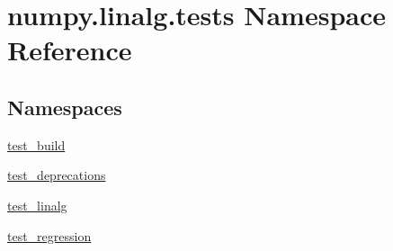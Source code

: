 \hypertarget{namespacenumpy_1_1linalg_1_1tests}{}\section{numpy.\+linalg.\+tests Namespace Reference}
\label{namespacenumpy_1_1linalg_1_1tests}
\subsection*{Namespaces}
\begin{DoxyCompactItemize}
\item 
 \hyperlink{namespacenumpy_1_1linalg_1_1tests_1_1test__build}{test\+\_\+build}
\item 
 \hyperlink{namespacenumpy_1_1linalg_1_1tests_1_1test__deprecations}{test\+\_\+deprecations}
\item 
 \hyperlink{namespacenumpy_1_1linalg_1_1tests_1_1test__linalg}{test\+\_\+linalg}
\item 
 \hyperlink{namespacenumpy_1_1linalg_1_1tests_1_1test__regression}{test\+\_\+regression}
\end{DoxyCompactItemize}
